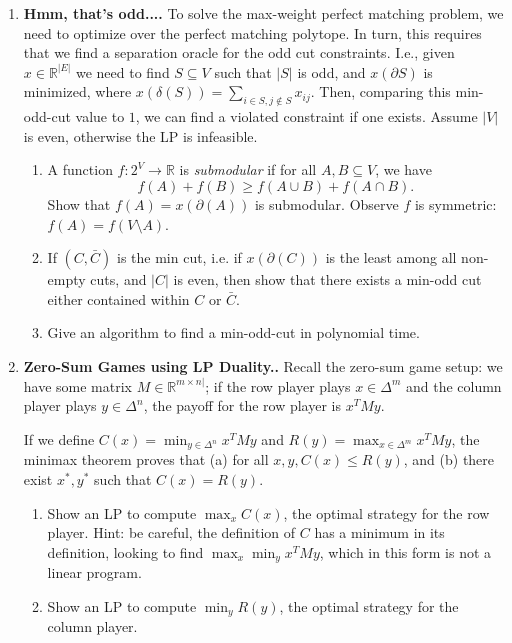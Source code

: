 \documentclass{article}
\theoremstyle{plain}
\newcommand{\R}{\mathbb{R}}
\newcommand\litem[1]{\item{\bfseries#1.\space}}
\begin{document}
\begin{enumerate}
  \litem{Hmm, that's odd...} To solve the max-weight perfect matching
  problem, we need to optimize over the perfect matching polytope. In
  turn, this requires that we find a separation oracle for the odd cut
  constraints. I.e., given $x\in \R^{|E|} $ we need to find
  $S \subseteq V$ such that $|S|$ is odd, and $x (\partial S)$ is
  minimized, where
  $x ( \delta(S)) = \sum_{i \in S, j \not \in S} x_{ij}$. Then,
  comparing this min-odd-cut value to $1$, we can find a violated
  constraint if one exists. Assume $|V| $ is even, otherwise the LP is
  infeasible.
  \begin{enumerate}
  \item A function $f : 2^V \to \R$ is \emph{submodular} if for all $A, B \subseteq V$, we have
    \[f(A) + f(B) \geq f(A \cup B) + f (A \cap B).\]
    Show that $f(A) = x (\partial(A))$ is submodular. Observe $f$ is symmetric: $f(A) = f(V \setminus A)$.
  \item If $(C, \bar{C})$ is the min cut, i.e. if $x (\partial(C))$ is
    the least among all non-empty cuts, and $|C|$ is even, then show
    that there exists a min-odd cut either contained within $C$ or
    $\bar{C}$.
    \item Give an algorithm to find a min-odd-cut in polynomial time. 
    \end{enumerate}

    \litem{Zero-Sum Games using LP Duality.} Recall the zero-sum game setup: we have some matrix $M \in \R^{m \times n|}$; if the row player plays $x \in \Delta^m$ and the column player plays $y \in \Delta^n$, the payoff for the row player is $x^T M y$.

    If we define $C(x) = \min_{y \in \Delta^n} x^T M y$ and $R(y) = \max_{x \in \Delta^m} x^T M y$, the minimax theorem proves that (a) for all $x,y, C(x) \leq R(y)$, and (b) there exist $x^*, y^*$ such that $C(x) = R(y)$.
    \begin{enumerate}
    \item Show an LP to compute $\max_x C(x)$, the optimal strategy for the row player. Hint: be careful, the definition of $C$ has a  minimum in its definition, looking to find $\max_x \min_y x^T M y$, which in this form is not a linear program.
    \item Show an LP to compute $\min_y R(y)$, the optimal strategy for the column player.


\end{enumerate}
\end{enumerate}
\end{document}
